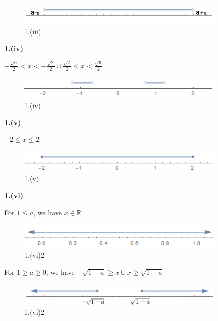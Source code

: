 \documentclass[a4paper,12pt]{report}
\begin{document}
\begin{figure}[h]
  \centering
  \includegraphics[width=10cm]{Pics/Chap41(iii).png}
  \caption{1.(iii)}
\end{figure}

\pagebreak
\noindent
\textbf{1.(iv)}

\noindent
$-\frac{\sqrt{6}}{2}<x<-\frac{\sqrt{2}}{2}\cup \frac{\sqrt{2}}{2}<x<\frac{\sqrt{6}}{2}$ 

\begin{figure}[h]
  \centering
  \includegraphics[width=10cm]{Pics/Chap41(iv).png}
  \caption{1.(iv)}
\end{figure}

\noindent
\textbf{1.(v)}

\noindent
$-2\leq x\leq 2$ 

\begin{figure}[h]
  \centering
  \includegraphics[width=10cm]{Pics/Chap41(v).png}
  \caption{1.(v)}
\end{figure}

\pagebreak
\noindent
\textbf{1.(vi)}

\noindent
For $1\leq a$, we have $x\in \mathbb{R}$

\begin{figure}[h]
  \centering
  \includegraphics[width=10cm]{Pics/Chap41(vi)1.png}
  \caption{1.(vi)2}
\end{figure}

\noindent
For $1\geq a \geq 0$, we have $-\sqrt{1-a} \geq x \cup x\geq \sqrt{1-a}$

\begin{figure}[h]
  \centering
  \includegraphics[width=10cm]{Pics/Chap41(vi)2.png}
  \caption{1.(vi)2}
\end{figure}
\end{document}

